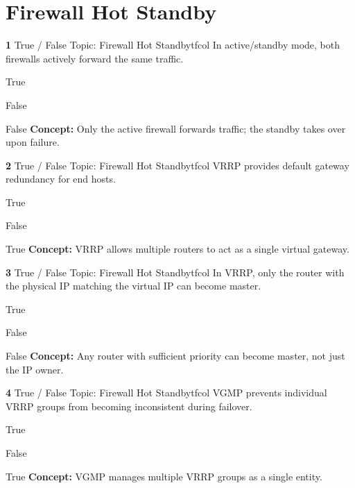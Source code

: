 \documentclass[10pt,a4paper]{article}
\begin{document}
\section{Firewall Hot Standby}
\begin{qcard}{\color{white}\textbf{1} \hfill \small True / False \textbar{} Topic: Firewall Hot Standby}{tfcol}
In active/standby mode, both firewalls actively forward the same traffic.

\begin{qoptions}
\item True
\item False
\end{qoptions}
\begin{explainbox}{False}
\textbf{Concept:} Only the active firewall forwards traffic; the standby takes over upon failure.
\end{explainbox}
\end{qcard}

\begin{qcard}{\color{white}\textbf{2} \hfill \small True / False \textbar{} Topic: Firewall Hot Standby}{tfcol}
VRRP provides default gateway redundancy for end hosts.

\begin{qoptions}
\item True
\item False
\end{qoptions}
\begin{explainbox}{True}
\textbf{Concept:} VRRP allows multiple routers to act as a single virtual gateway.
\end{explainbox}
\end{qcard}

\begin{qcard}{\color{white}\textbf{3} \hfill \small True / False \textbar{} Topic: Firewall Hot Standby}{tfcol}
In VRRP, only the router with the physical IP matching the virtual IP can become master.

\begin{qoptions}
\item True
\item False
\end{qoptions}
\begin{explainbox}{False}
\textbf{Concept:} Any router with sufficient priority can become master, not just the IP owner.
\end{explainbox}
\end{qcard}

\begin{qcard}{\color{white}\textbf{4} \hfill \small True / False \textbar{} Topic: Firewall Hot Standby}{tfcol}
VGMP prevents individual VRRP groups from becoming inconsistent during failover.

\begin{qoptions}
\item True
\item False
\end{qoptions}
\begin{explainbox}{True}
\textbf{Concept:} VGMP manages multiple VRRP groups as a single entity.
\end{explainbox}
\end{qcard}
\end{document}
